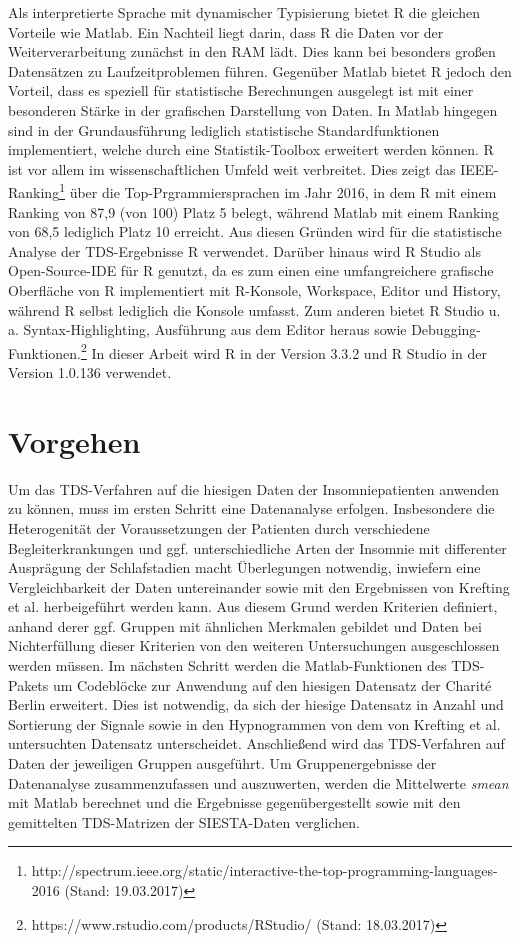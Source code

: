 Als interpretierte Sprache mit dynamischer Typisierung bietet R die gleichen Vorteile wie Matlab. Ein Nachteil liegt darin, dass R die Daten vor der Weiterverarbeitung zunächst in den RAM lädt. Dies kann bei besonders großen Datensätzen zu Laufzeitproblemen führen. Gegenüber Matlab bietet R jedoch den Vorteil, dass es speziell für statistische Berechnungen ausgelegt ist mit einer besonderen Stärke in der grafischen Darstellung von Daten. In Matlab hingegen sind in der Grundausführung lediglich statistische Standardfunktionen implementiert, welche durch eine Statistik-Toolbox erweitert werden können. R ist vor allem im wissenschaftlichen Umfeld weit verbreitet. Dies zeigt das IEEE-Ranking\footnote{http://spectrum.ieee.org/static/interactive-the-top-programming-languages-2016 (Stand: 19.03.2017)} über die Top-Prgrammiersprachen im Jahr 2016, in dem R mit einem Ranking von 87,9 (von 100) Platz 5 belegt, während Matlab mit einem Ranking von 68,5 lediglich Platz 10 erreicht. Aus diesen Gründen wird für die statistische Analyse der \acs{TDS}-Ergebnisse R verwendet. Darüber hinaus wird R Studio als Open-Source-IDE für R genutzt, da es zum einen eine umfangreichere grafische Oberfläche von R implementiert mit R-Konsole, Workspace, Editor und History, während R selbst lediglich die Konsole umfasst. Zum anderen bietet R Studio u. a. Syntax-Highlighting, Ausführung aus dem Editor heraus sowie Debugging-Funktionen.\footnote{https://www.rstudio.com/products/RStudio/ (Stand: 18.03.2017)} In dieser Arbeit wird R in der Version 3.3.2 und R Studio in der Version 1.0.136 verwendet.

\section{Vorgehen}

Um das \acs{TDS}-Verfahren auf die hiesigen Daten der Insomniepatienten anwenden zu können, muss im ersten Schritt eine Datenanalyse erfolgen. Insbesondere die Heterogenität der Voraussetzungen der Patienten durch verschiedene Begleiterkrankungen und ggf. unterschiedliche Arten der Insomnie mit differenter Ausprägung der Schlafstadien macht Überlegungen notwendig, inwiefern eine Vergleichbarkeit der Daten untereinander sowie mit den Ergebnissen von Krefting et al. \parencite{krefting_age_2017} herbeigeführt werden kann. Aus diesem Grund werden Kriterien definiert, anhand derer ggf. Gruppen mit ähnlichen Merkmalen gebildet und Daten bei Nichterfüllung dieser Kriterien von den weiteren Untersuchungen ausgeschlossen werden müssen. Im nächsten Schritt werden die Matlab-Funktionen des \acs{TDS}-Pakets um Codeblöcke zur Anwendung auf den hiesigen Datensatz der Charit\'{e} Berlin erweitert. Dies ist notwendig, da sich der hiesige Datensatz in Anzahl und Sortierung der Signale sowie in den Hypnogrammen von dem von Krefting et al. untersuchten Datensatz unterscheidet. Anschließend wird das \acs{TDS}-Verfahren auf Daten der jeweiligen Gruppen ausgeführt. Um Gruppenergebnisse der Datenanalyse zusammenzufassen und auszuwerten, werden die Mittelwerte \textit{smean} mit Matlab berechnet und die Ergebnisse gegenübergestellt sowie mit den gemittelten \acs{TDS}-Matrizen der SIESTA-Daten verglichen.\\

